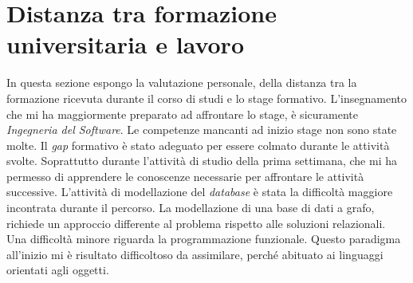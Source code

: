\section{Distanza tra formazione universitaria e lavoro}
In questa sezione espongo la valutazione personale, della distanza tra la formazione ricevuta durante il corso di studi e lo stage formativo. 
L'insegnamento che mi ha maggiormente preparato ad affrontare lo stage, è sicuramente \emph{Ingegneria del Software}.
Le competenze mancanti ad inizio stage non sono state molte.
Il \emph{gap} formativo è stato adeguato per essere colmato durante le attività svolte. Soprattutto durante l'attività di studio della prima settimana, che mi ha permesso di apprendere le conoscenze necessarie per affrontare le attività successive.
L'attività di modellazione del \emph{database} è stata la difficoltà maggiore incontrata durante il percorso. La modellazione di una base di dati a grafo, richiede un approccio differente al problema rispetto alle soluzioni relazionali.
Una difficoltà minore riguarda la programmazione funzionale. Questo paradigma all'inizio mi è risultato difficoltoso da assimilare, perché abituato ai linguaggi orientati agli oggetti.
